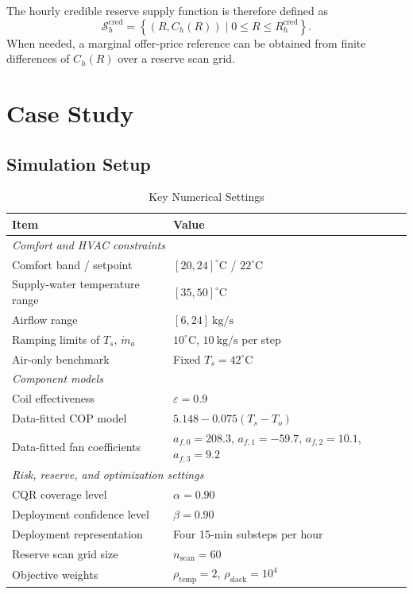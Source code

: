 \documentclass[journal]{IEEEtran}
\theoremstyle{remark}
\begin{document}
The hourly credible reserve supply function is therefore
defined as
\begin{equation}
	\mathcal{S}_h^{\mathrm{cred}}
	=
	\left\{
	(R,C_h(R))
	\mid
	0\le R\le R_h^{\mathrm{cred}}
	\right\}.
	\label{eq:final_supply_function}
\end{equation}
When needed, a marginal offer-price reference can be obtained
from finite differences of $C_h(R)$ over a reserve scan grid.

\section{Case Study}
\label{sec:Case_Study}

\subsection{Simulation Setup}
\label{subsec:simulation_setup}
\begin{table}[t]
	\caption{Key Numerical Settings}
	\label{tab:simulation_setup}
	\centering
	\footnotesize
	\setlength{\tabcolsep}{3pt}
	\renewcommand{\arraystretch}{1.05}
	\begin{tabular}{p{} p{}}
		\toprule
		\textbf{Item} & \textbf{Value} \\
		\midrule
		\multicolumn{2}{l}{\textit{Comfort and HVAC constraints}} \\
		Comfort band / setpoint 
		& \([20,24]^\circ\mathrm{C}\) / \(22^\circ\mathrm{C}\) \\
		Supply-water temperature range 
		& \([35,50]^\circ\mathrm{C}\) \\
		Airflow range 
		& \([6,24]~\mathrm{kg/s}\) \\
		Ramping limits of \(T_s\), \(\dot m_a\) 
		& \(10^\circ\mathrm{C}\), \(10~\mathrm{kg/s}\) per step \\
        Air-only benchmark 
		& Fixed \(T_s=42^\circ\mathrm{C}\) \\
		\midrule
		\multicolumn{2}{l}{\textit{Component models}} \\
		Coil effectiveness 
		& \(\varepsilon=0.9\) \\
    	Data-fitted COP model 
		& \(5.148-0.075(T_s-T_o)\) \\
		Data-fitted fan coefficients 
		& \(a_{f,0}=208.3\), \(a_{f,1}=-59.7\),
\(a_{f,2}=10.1\), \(a_{f,3}=9.2\) \\ 
		\midrule
		\multicolumn{2}{l}{\textit{Risk, reserve, and optimization settings}} \\
		CQR coverage level 
		& \(\alpha=0.90\) \\
		Deployment confidence level 
		& \(\beta=0.90\) \\
		Deployment representation 
		& Four 15-min substeps per hour \\
		Reserve scan grid size 
		& \(n_{\mathrm{scan}}=60\) \\
		Objective weights 
		& \(\rho_{\mathrm{temp}}=2\), \(\rho_{\mathrm{slack}}=10^4\) \\
		\bottomrule
	\end{tabular}
\end{table}
\end{document}
